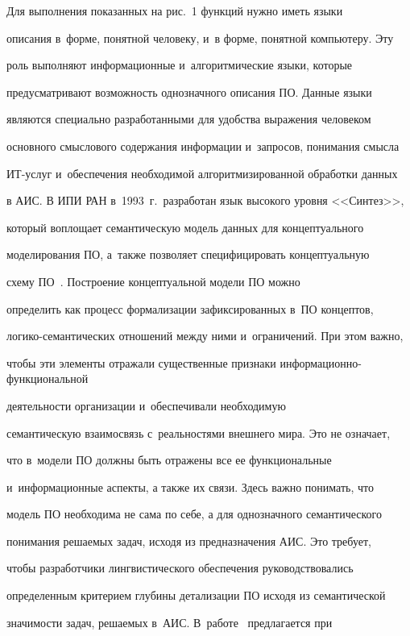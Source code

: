   


  Для выполнения показанных на рис.~1 функций нужно иметь языки 


описания в~форме, понятной человеку, и~в форме, понятной компьютеру. Эту 


роль выполняют информационные и~алгоритмические языки, которые 


предусматривают возможность однозначного описания ПО. Данные языки 


являются специально разработанными для удобства выражения человеком 


основного смыслового содержания информации и~запросов, понимания смысла 


ИТ-услуг и~обеспечения необходимой алгоритмизированной обработки данных 


в АИС. В ИПИ РАН в~1993~г.\ разработан язык высокого уровня <<Синтез>>, 


который воплощает семантическую модель данных для концептуального 


моделирования ПО, а~также позволяет специфицировать концептуальную 


схему ПО~\cite{8-rod}. Построение концептуальной модели ПО можно 


определить как процесс формализации зафиксированных в~ПО концептов, 


логико-семантических отношений между ними и~ограничений. При этом важно, 


чтобы эти элементы отражали существенные признаки информационно-функциональной 


деятельности организации и~обеспечивали необходимую 


семантическую взаимосвязь с~реальностями внешнего мира. Это не означает, 


что в~модели ПО должны быть отражены все ее функциональные 


и~информационные аспекты, а также их связи. Здесь важно понимать, что 


модель ПО необходима не сама по себе, а для однозначного семантического 


понимания решаемых задач, исходя из предназначения АИС. Это требует, 


чтобы разработчики лингвистического обеспечения руководствовались 


определенным критерием глубины детализации ПО исходя из семантической 


значимости задач, решаемых в~АИС. В~работе~\cite{9-rod} предлагается при 


